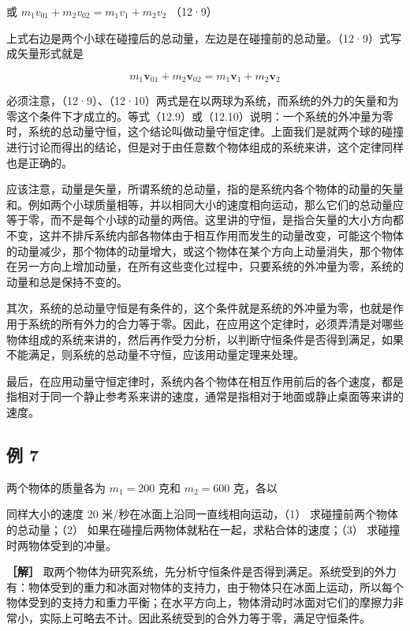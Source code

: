 或 \(m_{1}v_{01}+m_{2}v_{02}=m_{1}v_{1}+m_{2}v_{2}\) （12·9）

上式右边是两个小球在碰撞后的总动量，左边是在碰撞前的总动量。（12·9）式写成矢量形式就是

\[
m_{1}\boldsymbol{v}_{01}+m_{2}\boldsymbol{v}_{02}=m_{1}\boldsymbol{v}_{1}+m_{2}\boldsymbol{v}_{2} \tag{12.10}
\]

必须注意，（12·9）、（12·10）两式是在以两球为系统，而系统的外力的矢量和为零这个条件下才成立的。等式（12.9）或（12.10）说明：一个系统的外冲量为零时，系统的总动量守恒，这个结论叫做动量守恒定律。上面我们是就两个球的碰撞进行讨论而得出的结论，但是对于由任意数个物体组成的系统来讲，这个定律同样也是正确的。

应该注意，动量是矢量，所谓系统的总动量，指的是系统内各个物体的动量的矢量和。例如两个小球质量相等，并以相同大小的速度相向运动，那么它们的总动量应等于零，而不是每个小球的动量的两倍。这里讲的守恒，是指合矢量的大小方向都不变，这并不排斥系统内部各物体由于相互作用而发生的动量改变，可能这个物体的动量减少，那个物体的动量增大，或这个物体在某个方向上动量消失，那个物体在另一方向上增加动量，在所有这些变化过程中，只要系统的外冲量为零，系统的动量和总是保持不变的。

其次，系统的总动量守恒是有条件的，这个条件就是系统的外冲量为零，也就是作用于系统的所有外力的合力等于零。因此，在应用这个定律时，必须弄清是对哪些物体组成的系统来讲的，然后再作受力分析，以判断守恒条件是否得到满足，如果不能满足，则系统的总动量不守恒，应该用动量定理来处理。

最后，在应用动量守恒定律时，系统内各个物体在相互作用前后的各个速度，都是指相对于同一个静止参考系来讲的速度，通常是指相对于地面或静止桌面等来讲的速度。

\subsection{例 7}\label{ux4f8b-7-6}

两个物体的质量各为 \(m_{1}=200\) 克和 \(m_{2}=600\) 克，各以

同样大小的速度 20 米/秒在冰面上沿同一直线相向运动，（1）
求碰撞前两个物体的总动量；（2）
如果在碰撞后两物体就粘在一起，求粘合体的速度；（3）
求碰撞时两物体受到的冲量。

\textbf{［解］}
取两个物体为研究系统，先分析守恒条件是否得到满足。系统受到的外力有：物体受到的重力和冰面对物体的支持力，由于物体只在冰面上运动，所以每个物体受到的支持力和重力平衡；在水平方向上，物体滑动时冰面对它们的摩擦力非常小，实际上可略去不计。因此系统受到的合外力等于零，满足守恒条件。

